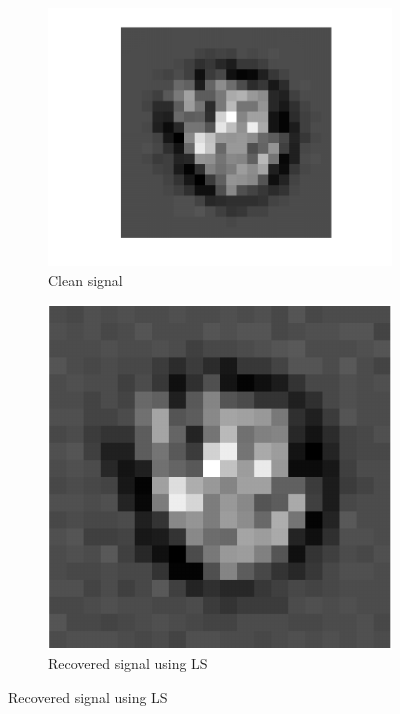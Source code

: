 \documentclass[english]{article}
\numberwithin{equation}{section}
\theoremstyle{plain}
\theoremstyle{definition}
\theoremstyle{remark}
\theoremstyle{plain}
\theoremstyle{remark}
\theoremstyle{plain}
\theoremstyle{plain}
\begin{document}
\begin{figure}[ht!]
	\begin{subfigure}{.5\textwidth}
	\centering
	\includegraphics[scale=0.5]{signal2D_clean}
	\caption{Clean signal}
	\label{fig:signal2D_clean}
\end{subfigure}%
\begin{subfigure}{.5\textwidth}
	\centering
	\includegraphics[scale=0.5]{signal2D_LS}
	\caption{Recovered signal using LS}
	\label{fig:signal2D_LS}
\end{subfigure}

\end{figure}
\end{document}
